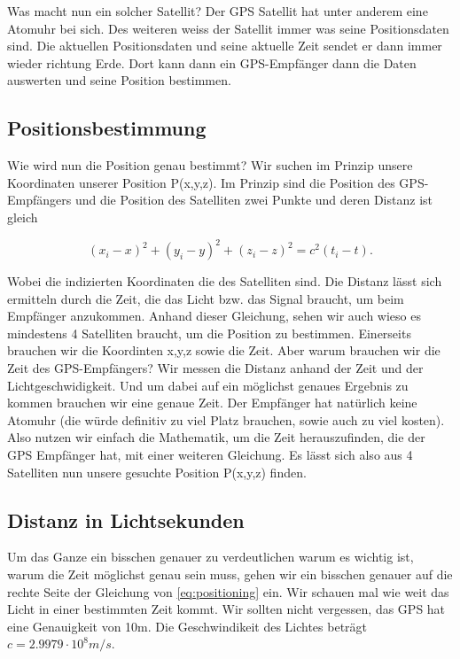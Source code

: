 \begin{refsection}
Was macht nun ein solcher Satellit? Der GPS Satellit hat unter anderem eine Atomuhr bei sich. Des weiteren weiss der Satellit immer was seine Positionsdaten sind. Die aktuellen Positionsdaten und seine aktuelle Zeit sendet er dann immer wieder richtung Erde. Dort kann dann ein GPS-Empfänger dann die Daten auswerten und seine Position bestimmen.

\subsection{Positionsbestimmung}
Wie wird nun die Position genau bestimmt? Wir suchen im Prinzip unsere Koordinaten unserer Position P(x,y,z). Im Prinzip sind die Position des GPS-Empfängers und die Position des Satelliten zwei Punkte und deren Distanz ist gleich

\begin{equation}
\label{eq:positioning}
    (x_i-x)^2 + (y_i-y)^2 + (z_i-z)^2 = c^2 (t_i -t).
\end{equation}

\noindent{}Wobei die indizierten Koordinaten die des Satelliten sind. Die Distanz lässt sich ermitteln durch die Zeit, die das Licht bzw. das Signal braucht, um beim Empfänger anzukommen. 
Anhand dieser Gleichung, sehen wir auch wieso es mindestens 4 Satelliten braucht, um die Position zu bestimmen. Einerseits brauchen wir die Koordinten x,y,z sowie die Zeit. Aber warum brauchen wir die Zeit des GPS-Empfängers? Wir messen die Distanz anhand der Zeit und der Lichtgeschwidigkeit. Und um dabei auf ein möglichst genaues Ergebnis zu kommen brauchen wir eine genaue Zeit. Der Empfänger hat natürlich keine Atomuhr (die würde definitiv zu viel Platz brauchen, sowie auch zu viel kosten). Also nutzen wir einfach die Mathematik, um die Zeit herauszufinden, die der GPS Empfänger hat, mit einer weiteren Gleichung. Es lässt sich also aus 4 Satelliten nun unsere gesuchte Position P(x,y,z) finden. 

\subsection{Distanz in Lichtsekunden}
Um das Ganze ein bisschen genauer zu verdeutlichen warum es wichtig ist, warum die Zeit möglichst genau sein muss, gehen wir ein bisschen genauer auf die rechte Seite der Gleichung von \ref{eq:positioning} ein. Wir schauen mal wie weit das Licht in einer bestimmten Zeit kommt. Wir sollten nicht vergessen, das GPS hat eine Genauigkeit von 10m. Die Geschwindikeit des Lichtes beträgt  \(c = 2.9979 \cdot 10^8 m/s\). \\


\end{refsection}
